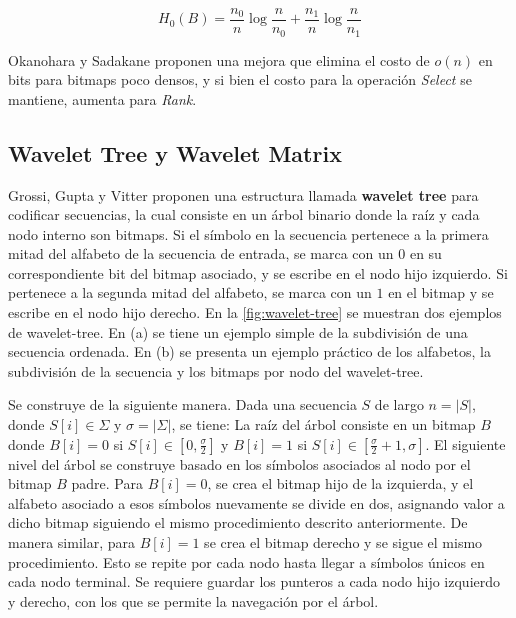 \begin{equation}
	H_{0}(B) = \frac{n_{0}}{n} \log\frac{n}{n_{0}} + \frac{n_{1}}{n} \log\frac{n}{n_{1}}
\end{equation}

Okanohara y Sadakane \cite{DBLP:journals/corr/abs-cs-0610001} proponen una mejora que elimina el costo de $o(n)$ en bits para bitmaps poco densos, y si bien el costo para la operación \textit{Select} se mantiene, aumenta para \textit{Rank}.


\subsection{Wavelet Tree y Wavelet Matrix}
Grossi, Gupta y Vitter \cite{grossi2003high} proponen una estructura llamada \textbf{wavelet tree} para codificar secuencias, la cual consiste en un árbol binario donde la raíz y cada nodo interno son bitmaps. Si el símbolo en la secuencia pertenece a la primera mitad del alfabeto de la secuencia de entrada, se marca con un $0$ en su correspondiente bit del bitmap asociado, y se escribe en el nodo hijo izquierdo. Si pertenece a la segunda mitad del alfabeto, se marca con un $1$ en el bitmap y se escribe en el nodo hijo derecho. En la \autoref{fig:wavelet-tree} se muestran dos ejemplos de wavelet-tree. En (a) se tiene un ejemplo simple de la subdivisión de una secuencia ordenada. En (b) se presenta un ejemplo práctico de los alfabetos, la subdivisión de la secuencia y los bitmaps por nodo del wavelet-tree.



Se construye de la siguiente manera. Dada una secuencia $S$ de largo $n = |S|$, donde $S[i] \in \Sigma$ y $\sigma = |\Sigma|$, se tiene: La raíz del árbol consiste en un bitmap $B$ donde $B[i] = 0$ si $S[i] \in [0, \frac{\sigma}{2}]$ y $B[i] = 1$ si $S[i] \in [\frac{\sigma}{2} + 1, \sigma]$. El siguiente nivel del árbol se construye basado en los símbolos asociados al nodo por el bitmap $B$ padre. Para $B[i] = 0$, se crea el bitmap hijo de la izquierda, y el alfabeto asociado a esos símbolos nuevamente se divide en dos, asignando valor a dicho bitmap siguiendo el mismo procedimiento descrito anteriormente. De manera similar, para $B[i] = 1$ se crea el bitmap derecho y se sigue el mismo procedimiento. Esto se repite por cada nodo hasta llegar a símbolos únicos en cada nodo terminal. Se requiere guardar los punteros a cada nodo hijo izquierdo y derecho, con los que se permite la navegación por el árbol.


